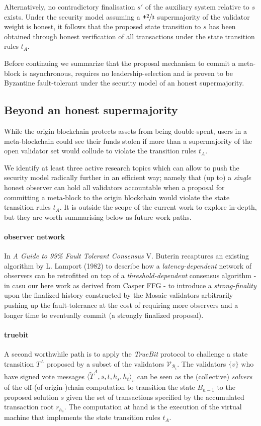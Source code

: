 \documentclass[12pt,a4paper]{article}
\begin{document}
Alternatively, no contradictory finalisation $s'$ of the auxiliary system relative to $s$ exists.
Under the security model assuming a $\texttt{+}\sfrac{2}{3}$ supermajority of the validator weight is honest, it follows that the proposed state transition to $s$ has been obtained through honest verification of all transactions under the state transition rules $t_A$.

Before continuing we summarize that the proposal mechanism to commit a meta-block is asynchronous, requires no leadership-selection and is proven to be Byzantine fault-tolerant under the security model of an honest supermajority.

\subsection{Beyond an honest supermajority}

While the origin blockchain protects assets from being double-spent, users in a meta-blockchain could see their funds stolen if more than a supermajority of the open validator set would collude to violate the transition rules $t_A$. 

We identify at least three active research topics which can allow to push the security model radically further in an efficient way; namely that (up to) a \emph{single} honest observer can hold all validators accountable when a proposal for committing a meta-block to the origin blockchain would violate the state transition rules $t_A$.
It is outside the scope of the current work to explore in-depth, but they are worth summarising below as future work paths.

\paragraph{observer network} In \textit{A Guide to 99\% Fault Tolerant Consensus}\cite{honestobserver} V. Buterin recaptures an existing algorithm by L. Lamport (1982) to describe how a \emph{latency-dependent} network of observers can be retrofitted on top of a \emph{threshold-dependent} consensus algorithm - in casu our here work as derived from Casper FFG - to introduce a \emph{strong-finality} upon the finalized history constructed by the Mosaic validators arbitrarily pushing up the fault-tolerance at the cost of requiring more observers and a longer time to eventually commit (a strongly finalized proposal).

\paragraph{truebit} A second worthwhile path is to apply the \textit{TrueBit}\cite{truebit} protocol to challenge a state transition $T^A$ proposed by a subset of the validators $\mathcal{V}_{\mathcal{B}_i}$.
The validators $\{v\}$ who have signed vote messages $\langle\tilde{T}^A, s, t, h_s, h_t\rangle_v$ can be seen as the (collective) \emph{solvers} of the off-(of-origin-)chain computation to transition the state $B_{n-1}$ to the proposed solution $s$ given the set of transactions specified by the accumulated transaction root $r_{h_s}$.
The computation at hand is the execution of the virtual machine that implements the state transition rules $t_A$.
\end{document}
